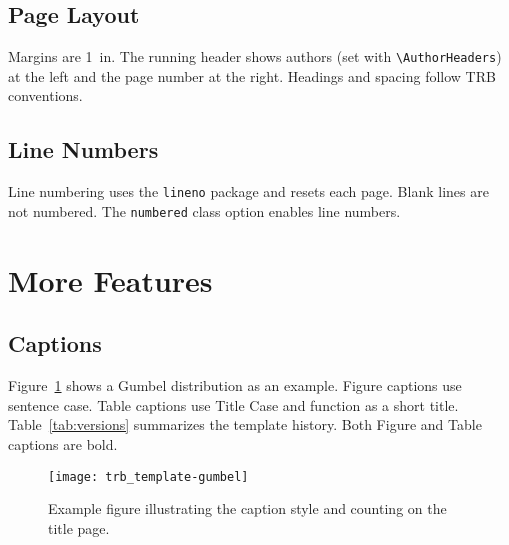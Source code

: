 \documentclass[numbered]{trbunofficial}
\begin{document}
\subsection{Page Layout}
Margins are 1~in. The running header shows authors (set with \verb|\AuthorHeaders|) at the left and the page number at the right. Headings and spacing follow TRB conventions.

\subsection{Line Numbers}
Line numbering uses the \verb|lineno| package and resets each page. Blank lines are not numbered. The \verb|numbered| class option enables line numbers.

\section{More Features}

\subsection{Captions}
Figure~\ref{fig:trial} shows a Gumbel distribution as an example. Figure captions use sentence case.  Table captions use Title Case and function as a short title. Table~\ref{tab:versions} summarizes the template history.  Both Figure and Table captions are bold.

\begin{figure}[htbp]
  \centering
  \texttt{[image: trb\_template-gumbel]}
  \caption{Example figure illustrating the caption style and counting on the title page.}\label{fig:trial}
\end{figure}
\end{document}
